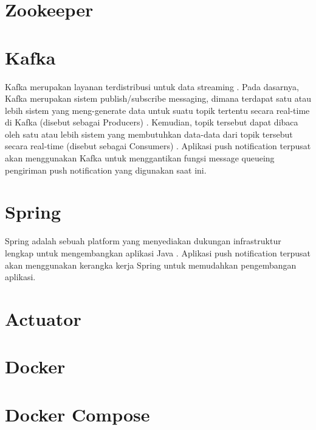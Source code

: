 \section{Zookeeper}

\section{Kafka}
\par Kafka merupakan layanan terdistribusi untuk data streaming \cite{kafka-online}. Pada dasarnya, Kafka merupakan sistem publish/subscribe messaging, dimana terdapat satu atau lebih sistem yang meng-generate data untuk suatu topik tertentu secara real-time di Kafka (disebut sebagai Producers) \cite{kafka-online}. Kemudian, topik tersebut dapat dibaca oleh satu atau lebih sistem yang membutuhkan data-data dari topik tersebut secara real-time (disebut sebagai Consumers) \cite{kafka-online}. Aplikasi push notification terpusat akan menggunakan Kafka untuk menggantikan fungsi message queueing pengiriman push notification yang digunakan saat ini.

\section{Spring}
\par Spring adalah sebuah platform yang menyediakan dukungan infrastruktur lengkap untuk mengembangkan aplikasi Java \cite{spring-online}. Aplikasi push notification terpusat akan menggunakan kerangka kerja Spring untuk memudahkan pengembangan aplikasi.

\section{Actuator}

\section{Docker}

\section{Docker Compose}
